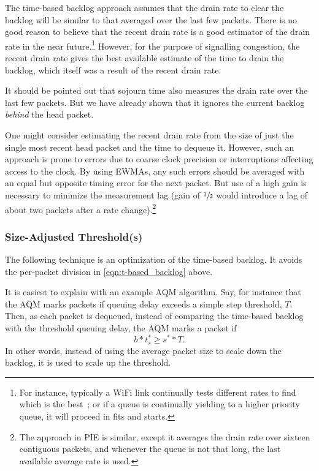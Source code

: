 The time-based backlog approach assumes that the drain rate to clear the backlog will be similar to that averaged over the last few packets. There is no good reason to believe that the recent drain rate is a good estimator of the drain rate in the near future.\footnote{For instance, typically a WiFi link continually tests different rates to find which is the best~\cite{McGregor10:Minstrel_TR}; or if a queue is continually yielding to a higher priority queue, it will proceed in fits and starts.} However, for the purpose of signalling congestion, the recent drain rate gives the best available estimate of the time to drain the backlog, which itself was a result of the recent drain rate.

It should be pointed out that sojourn time also measures the drain rate over the last few packets. But we have already shown that it ignores the current backlog \emph{behind} the head packet.

One might consider estimating the recent drain rate from the size of just the single most recent head packet and the time to dequeue it. However, such an approach is prone to errors due to coarse clock precision or interruptions affecting access to the clock. By using EWMAs, any such errors should be averaged with an equal but opposite timing error for the next packet. But use of a high gain is necessary to minimize the measurement lag (gain of \(\sfrac{1}{2}\) would introduce a lag of about two packets after a rate change).\footnote{The approach in PIE is similar, except it averages the drain rate over sixteen contiguous packets, and whenever the queue is not that long, the last available average rate is used.}

\subsubsection{Size-Adjusted Threshold(s)}\label{sec:time-adj_thresh}

The following technique is an optimization of the time-based backlog. It avoids the per-packet division in \autoref{eqn:t-based_backlog} above.

It is easiest to explain with an example AQM algorithm. Say, for instance that the AQM marks packets if queuing delay exceeds a simple step threshold, \(T\). Then, as each packet is dequeued, instead of comparing the time-based backlog with the threshold queuing delay, the AQM marks a packet if
\begin{equation}
	b * t_s^* \ge s^* * T.
\end{equation}
In other words, instead of using the average packet size to scale down the backlog, it is used to scale up the threshold.

